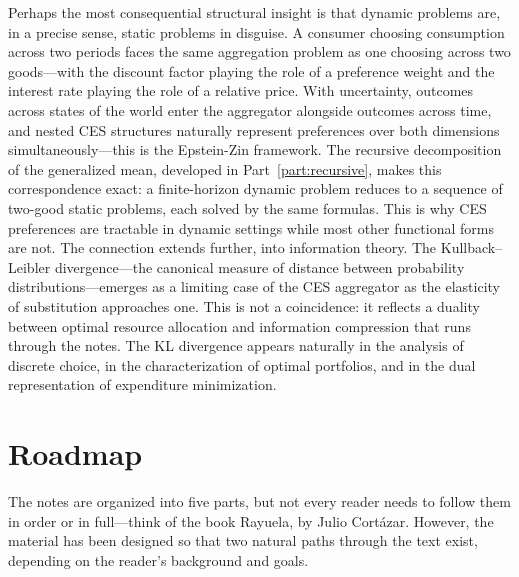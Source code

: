Perhaps the most consequential structural insight is that dynamic problems are, in a precise sense, static problems in disguise.
A consumer choosing consumption across two periods faces the same aggregation problem as one choosing across two goods---with the discount factor playing the role of a preference weight and the interest rate playing the role of a relative price.
With uncertainty, outcomes across states of the world enter the aggregator alongside outcomes across time, and nested CES structures naturally represent preferences over both dimensions simultaneously---this is the Epstein-Zin framework.
The recursive decomposition of the generalized mean, developed in Part~\ref{part:recursive}, makes this correspondence exact: a finite-horizon dynamic problem reduces to a sequence of two-good static problems, each solved by the same formulas.
This is why CES preferences are tractable in dynamic settings while most other functional forms are not.
The connection extends further, into information theory.
The Kullback--Leibler divergence---the canonical measure of distance between probability distributions---emerges as a limiting case of the CES aggregator as the elasticity of substitution approaches one.
This is not a coincidence: it reflects a duality between optimal resource allocation and information compression that runs through the notes.
The KL divergence appears naturally in the analysis of discrete choice, in the characterization of optimal portfolios, and in the dual representation of expenditure minimization.

\section{Roadmap}
\label{sec:roadmap}

The notes are organized into five parts, but not every reader needs to follow them in order or in full---think of the book Rayuela, by Julio Cortázar. However, the material has been designed so that two natural paths through the text exist, depending on the reader's background and goals.

